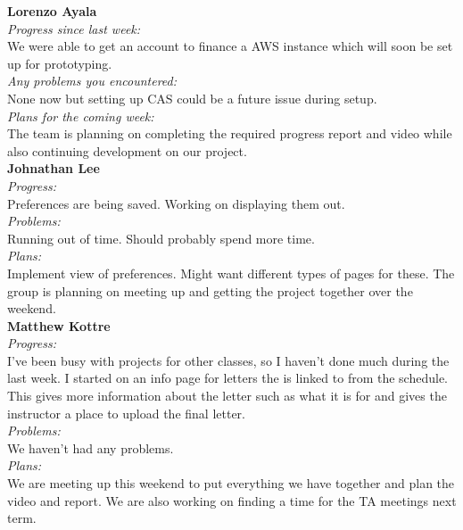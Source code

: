\textbf{Lorenzo Ayala}\\
\noindent\textit{Progress since last week:}\\
We were able to get an account to finance a AWS instance which will soon be set up for prototyping.\\

\noindent\textit{Any problems you encountered:}\\
\noindent None now but setting up CAS could be a future issue during setup.\\

\noindent\textit{Plans for the coming week:}\\
\noindent The team is planning on completing the required progress report and video while also continuing development on our project.\\

\noindent\textbf{Johnathan Lee}\\
\noindent\textit{Progress:}\\
Preferences are being saved. Working on displaying them out. \\ 

\noindent\textit{Problems:}\\
\noindent Running out of time. Should probably spend more time.\\

\noindent\textit{Plans:}\\
\noindent Implement view of preferences. Might want different types of pages for these. The group is planning on meeting up and getting the project together over the weekend.\\

\noindent\textbf{Matthew Kottre}\\
\noindent\textit{Progress:}\\
I've been busy with projects for other classes, so I haven't done much during the last week. I started on an info page for letters the is linked to from the schedule. This gives more information about the letter such as what it is for and gives the instructor a place to upload the final letter.\\

\noindent\textit{Problems:}\\
\noindent We haven't had any problems.\\

\noindent\textit{Plans:}\\
\noindent We are meeting up this weekend to put everything we have together and plan the video and report. We are also working on finding a time for the TA meetings next term.\\

